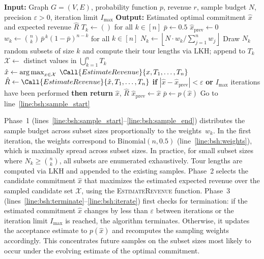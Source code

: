 \documentclass[11pt]{article}
\theoremstyle{plain}
\theoremstyle{definition}
\newcommand{\SingleSpacedXII}{}
\DeclareMathOperator*{\argmax}{arg\,max}
\begin{document}
	\begin{algorithm}[htbp]
		\SingleSpacedXII
		\caption{Adaptive Binomial Sampling Heuristic (BSH)}
		\label{alg:bsh}
		\begin{algorithmic}[1]
			\State \textbf{Input:} Graph $G = (V, E)$, probability function $p$, revenue $r$, sample budget $N$, precision $\varepsilon > 0$, iteration limit $I_{\max}$
			\State \textbf{Output:} Estimated optimal commitment $\hat{x}$ and expected revenue $\hat{R}$
			\Statex
			\State $T_k \gets ()$ for all $k \in [n]$
			\State $\bar{p} \gets 0.5$ \label{line:bsh:p_init} 
			\State $\hat{x}_{\mathrm{prev}} \gets 0$
			\Statex
			\State $w_k \gets \binom{n}{k}\, \bar{p}^{\,k} (1-\bar{p})^{n-k}$ for all $k \in [n]$ \label{line:bsh:weights}\label{line:bsh:sample_start}
			\State $N_k \gets \left\lfloor N \cdot w_k \big/ \sum_{j=1}^{n} w_j \right\rfloor$
			\State Draw $N_k$ random subsets of size $k$ and compute their tour lengths via \ac{LKH}; append to $T_k$
			\EndFor \label{line:bsh:sample_end}
			\Statex
			\State $\mathcal{X} \gets$ distinct values in $\bigcup_{k=1}^n T_k$ \label{line:bsh:candidates} 
			\State $\hat{x} \gets \argmax_{x \in \mathcal{X}}\; \Call{EstimateRevenue}{x, T_1, \ldots, T_n}$
			\State $\hat{R} \gets \Call{EstimateRevenue}{\hat{x}, T_1, \ldots, T_n}$
			\Statex
			\State \textbf{if} $|\hat{x} - \hat{x}_{\mathrm{prev}}| < \varepsilon$ \textbf{or} $I_{\max}$ iterations have been performed \textbf{then return} $\hat{x}$, $\hat{R}$ \label{line:bsh:terminate}
			\State $\hat{x}_{\mathrm{prev}} \gets \hat{x}$
			\State $\bar{p} \gets p(\hat{x})$ \label{line:bsh:alpha_update} 
			\State Go to line~\ref{line:bsh:sample_start} \label{line:bsh:iterate}
		\end{algorithmic}
	\end{algorithm}
	
	Phase~1 (lines~\ref{line:bsh:sample_start}--\ref{line:bsh:sample_end}) distributes the sample budget across subset sizes proportionally to the weights~$w_k$.
	In the first iteration, the weights correspond to $\mathrm{Binomial}(n, 0.5)$ (line~\ref{line:bsh:weights}), which is maximally spread across subset sizes.
	In practice, for small subset sizes where $N_k \geq \binom{n}{k}$, all subsets are enumerated exhaustively.
	Tour lengths are computed via \ac{LKH} and appended to the existing samples.
	Phase~2 selects the candidate commitment $\hat{x}$ that maximizes the estimated expected revenue over the sampled candidate set $\mathcal{X}$, using the \textsc{EstimateRevenue} function.
	Phase~3 (lines~\ref{line:bsh:terminate}--\ref{line:bsh:iterate}) first checks for termination: if the estimated commitment $\hat{x}$ changes by less than $\varepsilon$ between iterations or the iteration limit $I_{\max}$ is reached, the algorithm terminates.
	Otherwise, it updates the acceptance estimate to $p(\hat{x})$ and recomputes the sampling weights accordingly.
	This concentrates future samples on the subset sizes most likely to occur under the evolving estimate of the optimal commitment.
	
\end{document}
